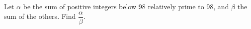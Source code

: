 Let $\alpha $ be the sum of positive integers below 98 relatively prime to 98, and $\beta $ the sum of the others. Find $\dfrac{\alpha}{\beta}$.
